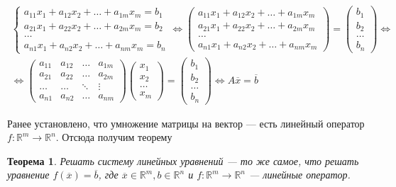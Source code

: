 \documentclass[]{article}
\newtheorem{thr}{Теорема}
\begin{document}
\begin{gather*}
	\begin{cases}
		a_{11}x_1 + a_{12}x_2 + \ldots + a_{1m}x_m=b_1
		\\
		a_{21}x_1 + a_{22}x_2 + \ldots + a_{2m}x_m=b_2
		\\
		\ldots
		\\
		a_{n1}x_1 + a_{n2}x_2 + \ldots + a_{nm}x_m=b_n
	\end{cases}
	\Leftrightarrow
	\begin{pmatrix}
	a_{11}x_1 + a_{12}x_2 + \ldots + a_{1m}x_m
	\\
	a_{21}x_1 + a_{22}x_2 + \ldots + a_{2m}x_m
	\\
	\ldots
	\\
	a_{n1}x_1 + a_{n2}x_2 + \ldots + a_{nm}x_m
\end{pmatrix}
=
	\begin{pmatrix}
	b_1
	\\
	b_2
	\\
	\ldots
	\\
	b_n
\end{pmatrix}
\Leftrightarrow
\\
\Leftrightarrow
	\begin{pmatrix}
	a_{11} & a_{12} & \ldots & a_{1m}
	\\
	a_{21} & a_{22} & \ldots & a_{2m}
	\\
	\ldots & \ldots & \ddots & \vdots
	\\
	a_{n1} & a_{n2} & \ldots & a_{nm}
\end{pmatrix}
\begin{pmatrix}
	x_{1}
	\\
	x_{2}
	\\
	\ldots
	\\
	x_{m}
\end{pmatrix}
=
\begin{pmatrix}
	b_1
	\\
	b_2
	\\
	\ldots
	\\
	b_n
\end{pmatrix}
\Leftrightarrow
A\overline{x}=\overline{b}
\end{gather*}

Ранее установлено, что умножение матрицы на вектор --- есть линейный оператор $f:\mathbb{R}^m\rightarrow\mathbb{R}^n$. Отсюда получим теорему

\begin{thr}
Решать систему линейных уравнений --- то же самое, что решать уравнение $f(\overline{x})=\overline{b}$, где $\overline{x}\in \mathbb{R}^m,b\in\mathbb{R}^n$ и $f:\mathbb{R}^m\rightarrow\mathbb{R}^n$ --- линейные оператор.
\end{thr}
\end{document}
